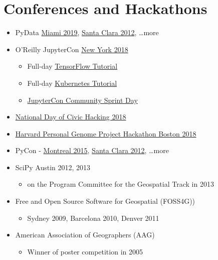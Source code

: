 \documentclass[12pt]{article}
\newenvironment{mitemize}
               {%
                 \setlength{\parskip}{3pt}
                 \setlength{\itemsep}{2.5pt plus 1pt}
                 \begin{itemize}}
               {\end{itemize}}
\begin{document}
\section*{Conferences and Hackathons} \hfill

\begin{mitemize}
\item PyData \href{https://pydata.org/miami2019/}{Miami 2019}, \href{https://conferences.oreilly.com/strata/strata2012/public/schedule/detail/23166}{Santa Clara 2012}, \ldots more
\item O'Reilly JupyterCon \href{https://conferences.oreilly.com/jupyter/jup-ny}{New York 2018}
  \begin{mitemize}
  \item Full-day \href{https://conferences.oreilly.com/jupyter/jup-ny/public/schedule/detail/68192}{TensorFlow Tutorial}
  \item Full-day \href{https://conferences.oreilly.com/jupyter/jup-ny/public/schedule/detail/69752}{Kubernetes Tutorial}
  \item \href{https://conferences.oreilly.com/jupyter/jup-ny/public/schedule/detail/71214}{JupyterCon Community Sprint Day}
  \end{mitemize}
  \item \href{https://codefortampabay.org/ndch-2018/}{National Day of Civic Hacking 2018}
  \item \href{https://pgp.med.harvard.edu/events/pgp-hackathon-1-0}{Harvard Personal Genome Project Hackathon Boston 2018}
  \item PyCon - \href{https://us.pycon.org/2015/}{Montreal 2015}, \href{https://us.pycon.org/2012/}{Santa Clara 2012}, \ldots more
  \item SciPy Austin 2012, 2013
    \begin{mitemize}
    \item on the Program Committee for the Geospatial Track in 2013
    \end{mitemize}
  \item Free and Open Source Software for Geospatial (FOSS4G))
    \begin{mitemize}
    \item Sydney 2009, Barcelona 2010, Denver 2011
    \end{mitemize}
  \item American Association of Geographers (AAG)
    \begin{mitemize}
    \item Winner of poster competition in 2005
    \end{mitemize}

\end{mitemize}
\end{document}

